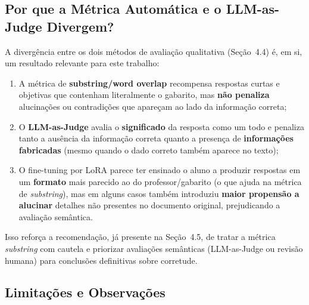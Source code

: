 \documentclass[12pt, a4paper]{article}
\begin{document}
\subsection{Por que a Métrica Automática e o LLM-as-Judge Divergem?}

A divergência entre os dois métodos de avaliação qualitativa (Seção~4.4) é, em si,
um resultado relevante para este trabalho:

\begin{enumerate}
  \item A métrica de \textbf{substring/word overlap} recompensa respostas curtas e
        objetivas que contenham literalmente o gabarito, mas \textbf{não penaliza}
        alucinações ou contradições que apareçam ao lado da informação correta;
  \item O \textbf{LLM-as-Judge} avalia o \textbf{significado} da resposta como um
        todo e penaliza tanto a ausência da informação correta quanto a presença de
        \textbf{informações fabricadas} (mesmo quando o dado correto também aparece
        no texto);
  \item O fine-tuning por LoRA parece ter ensinado o aluno a produzir respostas em um
        \textbf{formato} mais parecido ao do professor/gabarito (o que ajuda na
        métrica de \textit{substring}), mas em alguns casos também introduziu
        \textbf{maior propensão a alucinar} detalhes não presentes no documento
        original, prejudicando a avaliação semântica.
\end{enumerate}

Isso reforça a recomendação, já presente na Seção~4.5, de tratar a métrica
\textit{substring} com cautela e priorizar avaliações semânticas (LLM-as-Judge ou
revisão humana) para conclusões definitivas sobre corretude.

\subsection{Limitações e Observações}
\end{document}
